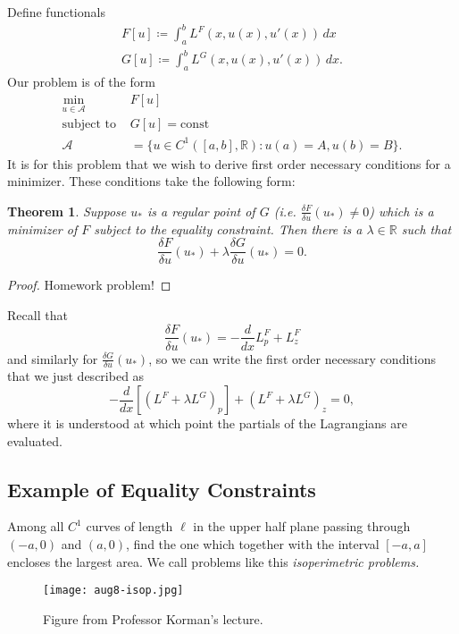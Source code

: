 \documentclass[11pt]{article}
\newcommand{\R}{\mathbb{R}}
\newtheorem{theorem}{Theorem}[subsection]
\begin{document}
Define functionals
\begin{align*}
F[u] \coloneqq \int_a^b L^F(x, u(x), u'(x)) \, dx \\
G[u] \coloneqq \int_a^b L^G(x, u(x), u'(x)) \, dx.
\end{align*}
Our problem is of the form
\begin{align*}
\min_{u \in \mathcal{A}} \qquad &F[u] \\
\text{subject to } &G[u] = \mathrm{const} \\
\mathcal{A} &= \{ u \in C^1([a, b], \R) : u(a) = A, u(b) = B \}.
\end{align*}
It is for this problem that we wish to derive first order necessary conditions for a minimizer. These conditions take the following form:
\begin{theorem}
Suppose $u_*$ is a \emph{regular point} of $G$ (i.e. $\frac{\delta F}{\delta u}(u_*) \neq 0$) which is a minimizer of $F$ subject to the equality constraint. Then there is a $\lambda \in \R$ such that
\[
\frac{\delta F}{\delta u}(u_*) + \lambda \frac{\delta G}{\delta u}(u_*) = 0.
\]
\end{theorem}
\begin{proof}
Homework problem!
\end{proof}

Recall that
\[
\frac{\delta F}{\delta u}(u_*) = -\frac{d}{dx} L_p^F + L_z^F
\]
and similarly for $\frac{\delta G}{\delta u}(u_*)$, so we can write the first order necessary conditions that we just described as
\[
-\frac{d}{dx} \left[ (L^F + \lambda L^G)_p \right] + \left( L^F + \lambda L^G \right)_z = 0,
\]
where it is understood at which point the partials of the Lagrangians are evaluated.

\subsection{Example of Equality Constraints}

Among all $C^1$ curves of length $\ell$ in the upper half plane passing through $(-a,0)$ and $(a, 0)$, find the one which together with the interval $[-a,a]$ encloses the largest area. We call problems like this \emph{isoperimetric problems.}

\begin{figure}[H]
\texttt{[image: aug8-isop.jpg]}
\centering
\caption{Figure from Professor Korman's lecture.}
\end{figure}
\end{document}
